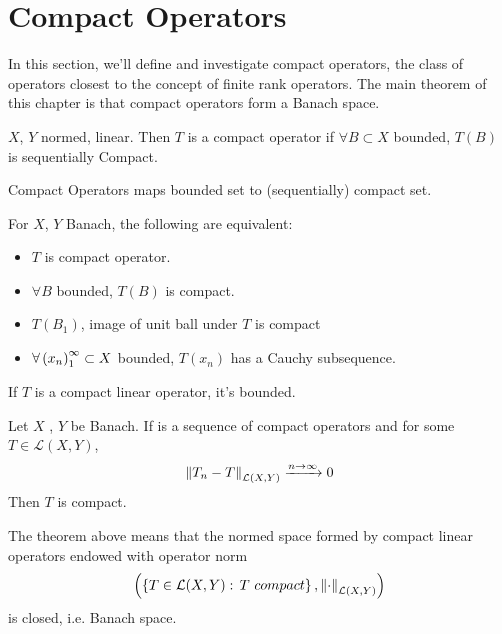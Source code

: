 \newpage
\section{Compact Operators}
In this section, we'll define and investigate compact operators, the class of operators closest to the concept of finite rank operators. The main theorem of this chapter is that compact operators form a Banach space.
\begin{definition}\nl
	$X$, $Y$ normed,  linear. Then $T$ is a compact operator if $\forall B\subset X$ bounded, $T(B)$ is sequentially Compact.
\end{definition}

\begin{remark}\nl
	{\color{blue} Compact Operators maps bounded set to (sequentially) compact set.}
\end{remark}

\begin{lemma}\nl
	For $X$, $Y$ Banach, the following are equivalent:
	\begin{itemize}
		\item $T$ is compact operator.
		\item $\forall B$ bounded, $T(B)$ is compact.
		\item $T(B_1)$, image of unit ball under $T$ is compact
		\item $\forall\left({x_n}\right)_1^\infty\subset X$ bounded, $T(x_n)$ has a Cauchy subsequence.
	\end{itemize}
\end{lemma}

\begin{proposition}\nl
	If $T$ is a compact linear operator, it's bounded.
\end{proposition}

\begin{example}\nl
	\placeholder
\end{example}

\begin{theorem}\nl
	Let $X$ , $Y$ be Banach. If  is a sequence of compact operators and for some $T\in\mathcal{L}(X,Y)$,
	$$
		\left\|{T_n-T}\right\|_{\mathcal{L}(X,Y)}\xrightarrow{n\to\infty}{0}
	$$
	Then $T$ is compact.
\end{theorem}

\begin{remark}\nl
	The theorem above means that the normed space  formed by compact linear operators endowed with operator norm
	$$
		\left(\left\{T\in\mathcal{L}(X,Y):\, T\,\,compact\right\},\left\|{\cdot}\right\|_{\mathcal{L}(X,Y)}\right)
	$$
	is closed, i.e. Banach space.
\end{remark}

